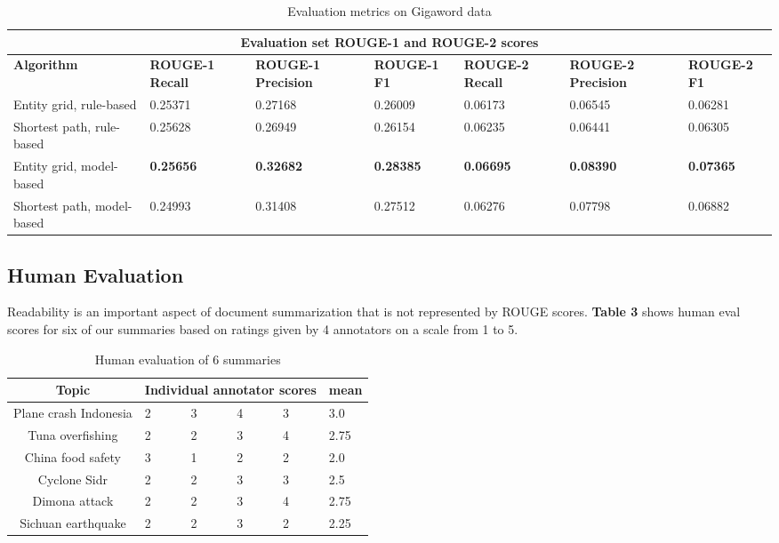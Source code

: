 \documentclass[11pt]{article}
\begin{document}
\begin{table}[h]
\begin{tabular}{|p{4.3cm}||p{1.735cm}|p{1.78cm}|p{1.735cm}|p{1.735cm}|p{1.78cm}|p{1.735cm}| }
 \hline
 \multicolumn{7}{|c|}{Evaluation set ROUGE-1 and ROUGE-2 scores} \\
 \hline
 \textbf{Algorithm} & \textbf{ROUGE-1 Recall} & \textbf{ROUGE-1 Precision} & \textbf{ROUGE-1 F1} & \textbf{ROUGE-2 Recall} & \textbf{ROUGE-2 Precision} & \textbf{ROUGE-2 F1}\\
 \hline
Entity grid, rule-based & 0.25371 & 0.27168 & 0.26009 & 0.06173 & 0.06545 & 0.06281 \\
Shortest path, rule-based & 0.25628 & 0.26949 & 0.26154 & 0.06235 & 0.06441 & 0.06305 \\
Entity grid, model-based & \textbf{0.25656} & \textbf{0.32682} & \textbf{0.28385} & \textbf{0.06695} & \textbf{0.08390} & \textbf{0.07365} \\
Shortest path, model-based & 0.24993 & 0.31408 & 0.27512 & 0.06276 & 0.07798 & 0.06882 \\
\hline
\end{tabular}
\caption{Evaluation metrics on Gigaword data}
\label{tab:dev} 
\end{table}

\subsection{Human Evaluation}
Readability is an important aspect of document summarization that is not represented by ROUGE scores. \textbf{Table 3} shows human eval scores for six of our summaries based on ratings given by 4 annotators on a scale from 1 to 5.

\begin{table}[h]
	\centering
	\begin{tabular}{|c|p{1cm}|p{1cm}|p{1cm}|p{1cm}|p{1cm}|}
	\hline
		\textbf{Topic} & \multicolumn{4}{|c|}{\textbf{Individual annotator scores}} & \textbf{mean}\\
	\hline
	Plane crash Indonesia & 2 & 3 & 4 & 3 & 3.0\\
	\hline
	Tuna overfishing & 2 & 2 & 3 & 4 & 2.75\\
	\hline
	China food safety & 3 & 1 & 2 & 2 & 2.0\\
	\hline
	Cyclone Sidr & 2 & 2 & 3 & 3 & 2.5\\
	\hline
	Dimona attack & 2 & 2 & 3 & 4 & 2.75 \\
	\hline
	Sichuan earthquake & 2 & 2 & 3 & 2 & 2.25\\
	\hline
\end{tabular}
\caption{Human evaluation of 6 summaries}
\label{tab:dev}
\end{table}
\end{document}

